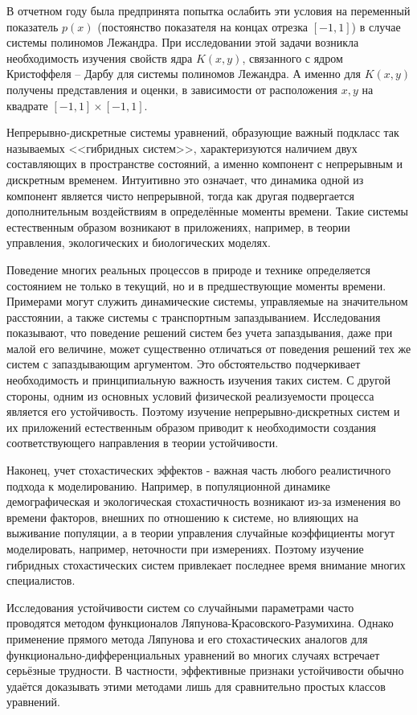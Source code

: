 В отчетном году была предпринята попытка ослабить эти условия на переменный показатель $p(x)$ (постоянство показателя на концах отрезка $[-1,1]$) в случае системы полиномов Лежандра. При исследовании этой задачи возникла необходимость изучения свойств ядра $K(x,y)$, связанного с ядром Кристоффеля -- Дарбу для системы полиномов Лежандра. А именно для $K(x,y)$ получены  представления и оценки, в зависимости от расположения $x,y$ на квадрате $[-1,1]\times[-1,1]$.




Непрерывно-дискретные системы уравнений, образующие важный подкласс так называемых <<гибридных систем>>, характеризуются наличием двух составляющих в пространстве состояний, а именно компонент с непрерывным и дискретным временем. Интуитивно
это означает, что динамика одной из компонент является чисто
непрерывной, тогда как другая подвергается дополнительным
воздействиям в определённые моменты времени. Такие системы
естественным образом возникают в приложениях, например, в теории
управления, экологических   и биологических моделях.

Поведение многих реальных процессов в природе и технике определяется
состоянием не только в текущий, но и в предшествующие моменты
времени. Примерами могут служить динамические системы, управляемые
на значительном расстоянии, а также системы с транспортным
запаздыванием. Исследования показывают, что поведение решений систем
без учета запаздывания, даже при малой его величине, может
существенно отличаться от поведения решений тех же систем с
запаздывающим аргументом. Это обстоятельство подчеркивает
необходимость и принципиальную важность изучения таких систем. С
другой стороны, одним из основных условий физической реализуемости
процесса является его устойчивость. Поэтому изучение непрерывно-дискретных
систем и их приложений естественным образом приводит к необходимости
создания соответствующего направления в теории устойчивости.

Наконец, учет стохастических эффектов - важная часть любого
реалистичного подхода к моделированию. Например, в популяционной
динамике демографическая и экологическая стохастичность возникают
из-за изменения во времени факторов, внешних по отношению к системе,
но влияющих на выживание популяции, а в теории управления случайные
коэффициенты могут моделировать, например, неточности при
измерениях. Поэтому изучение гибридных стохастических систем
привлекает последнее время внимание многих специалистов.

Исследования устойчивости систем со случайными параметрами часто
проводятся методом функционалов Ляпунова-Красовского-Разумихина.
Однако применение прямого метода Ляпунова и его стохастических
аналогов для функцио\-нально-диф\-фе\-рен\-ци\-аль\-ных уравнений во
многих случаях встречает серьёзные трудности. В частности,
эффективные признаки устойчивости обычно удаётся доказывать этими
методами лишь для сравнительно простых классов уравнений.

